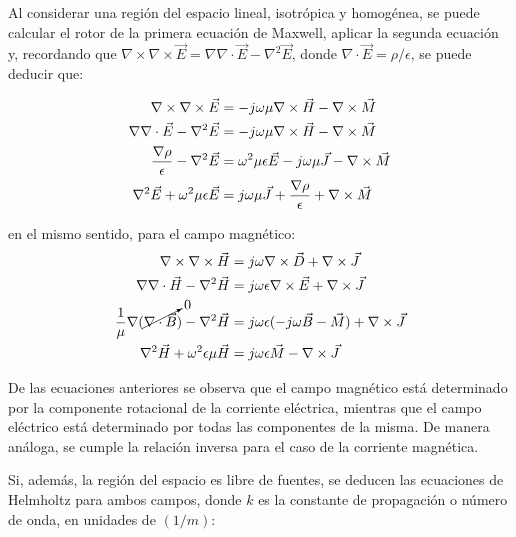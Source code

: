 Al considerar una región del espacio lineal, isotrópica y homogénea, se puede calcular el rotor de la primera ecuación de Maxwell, aplicar la segunda ecuación y, recordando que $\nabla \times \nabla \times \vec{E} = \nabla \nabla \cdot \vec{E} - \nabla^2\vec{E}$, donde $\nabla \cdot \vec{E} = \rho/\epsilon$, se puede deducir que:

\begin{align}
	\nabla \times \nabla \times \vec{E} & = -j \omega \mu \nabla \times \vec{H} - \nabla \times \vec{M} \notag \\
	\nabla \nabla \cdot \vec{E} - \nabla^2 \vec{E} & = -j \omega \mu \nabla \times \vec{H} - \nabla \times \vec{M} \notag \\
	\frac{\nabla \rho}{\epsilon} - \nabla^2 \vec{E} & = \omega^2 \mu \epsilon \vec{E} - j \omega \mu \vec{J} - \nabla \times \vec{M} \notag\\
	\nabla^2 \vec{E} + \omega^2 \mu \epsilon \vec{E} & = j \omega \mu \vec{J} + \frac{\nabla \rho}{\epsilon} + \nabla \times \vec{M}
	\label{eq:eq_ondas_completa_E}
\end{align}

en el mismo sentido, para el campo magnético:
\begin{align}
	\nabla \times \nabla \times \vec{H} & = j \omega \nabla \times \vec{D} +  \nabla \times \vec{J} \notag \\
	\nabla \nabla \cdot \vec{H} - \nabla^2 \vec{H} & = j \omega \epsilon \nabla \times \vec{E} + \nabla \times \vec{J} \notag \\
	\frac{1}{\mu} \nabla (\cancelto{0}{\nabla \cdot \vec{B}}) - \nabla^2 \vec{H} & = j \omega \epsilon (-j \omega \vec{B} - \vec{M}) + \nabla \times \vec{J} \notag \\
	\nabla^2 \vec{H} + \omega^2 \epsilon \mu \vec{H} & =  j \omega \epsilon \vec{M} - \nabla \times \vec{J}
	\label{eq:eq_ondas_completa_H}
\end{align}

De las ecuaciones anteriores se observa que el campo magnético está determinado por la componente rotacional de la corriente eléctrica, mientras que el campo eléctrico está determinado por todas las componentes de la misma. De manera análoga, se cumple la relación inversa para el caso de la corriente magnética.

Si, además, la región del espacio es libre de fuentes, se deducen las ecuaciones de Helmholtz para ambos campos, donde $k$ es la constante de propagación o número de onda, en unidades de $(1/m)$:


